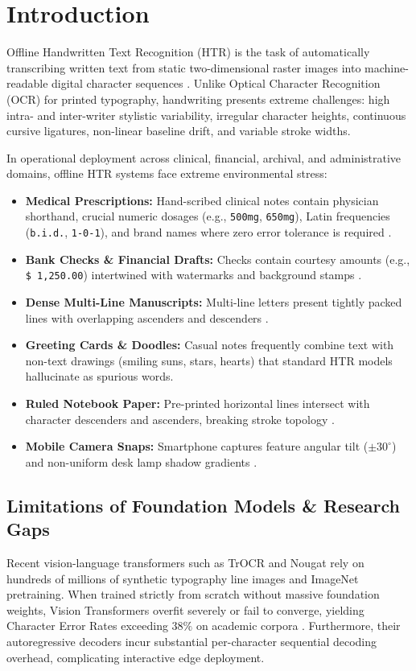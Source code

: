 \documentclass[twocolumn,10pt,a4paper]{article}
\begin{document}
\saythanks

\section{Introduction}\label{sec1}
Offline Handwritten Text Recognition (HTR) is the task of automatically transcribing written text from static two-dimensional raster images into machine-readable digital character sequences \cite{plamondon2000, memon2020}. Unlike Optical Character Recognition (OCR) for printed typography, handwriting presents extreme challenges: high intra- and inter-writer stylistic variability, irregular character heights, continuous cursive ligatures, non-linear baseline drift, and variable stroke widths.

In operational deployment across clinical, financial, archival, and administrative domains, offline HTR systems face extreme environmental stress:
\begin{itemize}
    \item \textbf{Medical Prescriptions:} Hand-scribed clinical notes contain physician shorthand, crucial numeric dosages (e.g., \texttt{500mg}, \texttt{650mg}), Latin frequencies (\texttt{b.i.d.}, \texttt{1-0-1}), and brand names where zero error tolerance is required \cite{bhunia2021}.
    \item \textbf{Bank Checks \& Financial Drafts:} Checks contain courtesy amounts (e.g., \texttt{\$ 1,250.00}) intertwined with watermarks and background stamps \cite{koerich2014}.
    \item \textbf{Dense Multi-Line Manuscripts:} Multi-line letters present tightly packed lines with overlapping ascenders and descenders \cite{romero2011}.
    \item \textbf{Greeting Cards \& Doodles:} Casual notes frequently combine text with non-text drawings (smiling suns, stars, hearts) that standard HTR models hallucinate as spurious words.
    \item \textbf{Ruled Notebook Paper:} Pre-printed horizontal lines intersect with character descenders and ascenders, breaking stroke topology \cite{zheng2013}.
    \item \textbf{Mobile Camera Snaps:} Smartphone captures feature angular tilt ($\pm 30^\circ$) and non-uniform desk lamp shadow gradients \cite{chen2019}.
\end{itemize}

\subsection{Limitations of Foundation Models & Research Gaps}
Recent vision-language transformers such as TrOCR \cite{li2023trocr} and Nougat \cite{blecher2023nougat} rely on hundreds of millions of synthetic typography line images and ImageNet pretraining. When trained strictly from scratch without massive foundation weights, Vision Transformers overfit severely or fail to converge, yielding Character Error Rates exceeding $38\%$ on academic corpora \cite{diaz2022rethinking, kang2023evaluating}. Furthermore, their autoregressive decoders incur substantial per-character sequential decoding overhead, complicating interactive edge deployment.
\end{document}
